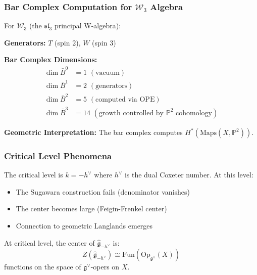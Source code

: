 \subsubsection{Bar Complex Computation for $\mathcal{W}_3$ Algebra}

\begin{example}\label{ex:w3-bar}
For $\mathcal{W}_3$ (the $\mathfrak{sl}_3$ principal W-algebra):

\textbf{Generators:} $T$ (spin 2), $W$ (spin 3)

\textbf{Bar Complex Dimensions:}
\begin{align}
\dim \bar{B}^0 &= 1 \,\, (\text{vacuum}) \\
\dim \bar{B}^1 &= 2 \,\, (\text{generators}) \\
\dim \bar{B}^2 &= 5 \,\, (\text{computed via OPE}) \\
\dim \bar{B}^3 &= 14 \,\, (\text{growth controlled by } \mathbb{P}^2 \text{ cohomology})
\end{align}

\textbf{Geometric Interpretation:} The bar complex computes $H^*(\mathrm{Maps}(X, \mathbb{P}^2))$.
\end{example}

\subsubsection{Critical Level Phenomena}

\begin{definition}\label{def:critical}
The critical level is $k = -h^\vee$ where $h^\vee$ is the dual Coxeter number. At this level:
\begin{itemize}
\item The Sugawara construction fails (denominator vanishes)
\item The center becomes large (Feigin-Frenkel center)
\item Connection to geometric Langlands emerges
\end{itemize}
\end{definition}

\begin{theorem}\label{t hm:ff-center}
At critical level, the center of $\widehat{\mathfrak{g}}_{-h^\vee}$ is:
\[
Z(\widehat{\mathfrak{g}}_{-h^\vee}) \cong \mathrm{Fun}(\mathrm{Op}_{\mathfrak{g}^\vee}(X))
\]
functions on the space of $\mathfrak{g}^\vee$\nobreakdash-opers on $X$.
\end{theorem}


